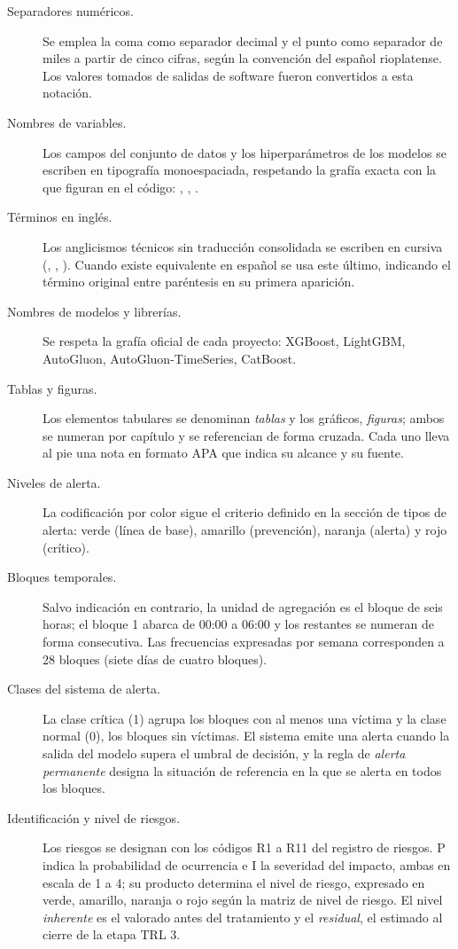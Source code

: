\begin{description}
  \item[Separadores numéricos.] Se emplea la coma como separador decimal y el
    punto como separador de miles a partir de cinco cifras, según la convención
    del español rioplatense. Los valores tomados de salidas de software fueron
    convertidos a esta notación.
  \item[Nombres de variables.] Los campos del conjunto de datos y los
    hiperparámetros de los modelos se escriben en tipografía monoespaciada,
    respetando la grafía exacta con la que figuran en el código:
    , , .
  \item[Términos en inglés.] Los anglicismos técnicos sin traducción consolidada
    se escriben en cursiva (, , ).
    Cuando existe equivalente en español se usa este último, indicando el
    término original entre paréntesis en su primera aparición.
  \item[Nombres de modelos y librerías.] Se respeta la grafía oficial de cada
    proyecto: XGBoost, LightGBM, AutoGluon, AutoGluon-TimeSeries, CatBoost.
  \item[Tablas y figuras.] Los elementos tabulares se denominan \emph{tablas} y
    los gráficos, \emph{figuras}; ambos se numeran por capítulo y se referencian
    de forma cruzada. Cada uno lleva al pie una nota en formato APA que indica
    su alcance y su fuente.
  \item[Niveles de alerta.] La codificación por color sigue el criterio definido
    en la sección de tipos de alerta: verde (línea de base), amarillo
    (prevención), naranja (alerta) y rojo (crítico).
  \item[Bloques temporales.] Salvo indicación en contrario, la unidad de
    agregación es el bloque de seis horas; el bloque 1 abarca de 00:00 a 06:00 y
    los restantes se numeran de forma consecutiva. Las frecuencias expresadas
    por semana corresponden a 28 bloques (siete días de cuatro bloques).
  \item[Clases del sistema de alerta.] La clase crítica (1) agrupa los bloques
    con al menos una víctima y la clase normal (0), los bloques sin víctimas. El
    sistema emite una alerta cuando la salida del modelo supera el umbral de
    decisión, y la regla de \emph{alerta permanente} designa la situación de
    referencia en la que se alerta en todos los bloques.
  \item[Identificación y nivel de riesgos.] Los riesgos se designan con los
    códigos R1 a R11 del registro de riesgos. P indica la probabilidad de
    ocurrencia e I la severidad del impacto, ambas en escala de 1 a 4; su
    producto determina el nivel de riesgo, expresado en verde, amarillo, naranja
    o rojo según la matriz de nivel de riesgo. El nivel \emph{inherente} es el
    valorado antes del tratamiento y el \emph{residual}, el estimado al cierre de
    la etapa TRL 3.
\end{description}
